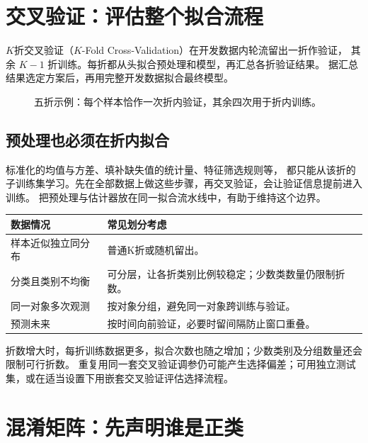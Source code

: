 \section{交叉验证：评估整个拟合流程}
\label{sec:eval-cv}

$K$折交叉验证（$K$-Fold Cross-Validation）在开发数据内轮流留出一折作验证，
其余 $K-1$ 折训练。每折都从头拟合预处理和模型，再汇总各折验证结果。
据汇总结果选定方案后，再用完整开发数据拟合最终模型。

\begin{figure}[htbp]
\centering
\caption{五折示例：每个样本恰作一次折内验证，其余四次用于折内训练。}
\label{fig:eval-cv}
\par\smallskip
{}
\end{figure}

\subsection{预处理也必须在折内拟合}
标准化的均值与方差、填补缺失值的统计量、特征筛选规则等，
都只能从该折的子训练集学习。先在全部数据上做这些步骤，再交叉验证，会让验证信息提前进入训练。
把预处理与估计器放在同一拟合流水线中，有助于维持这个边界。

\begin{center}
\small
\begin{tabularx}{\textwidth}{P{33mm}Y}
\toprule
数据情况 & 常见划分考虑\\
\midrule
样本近似独立同分布 & 普通K折或随机留出。\\
分类且类别不均衡 & 可分层，让各折类别比例较稳定；少数类数量仍限制折数。\\
同一对象多次观测 & 按对象分组，避免同一对象跨训练与验证。\\
预测未来 & 按时间向前验证，必要时留间隔防止窗口重叠。\\
\bottomrule
\end{tabularx}
\end{center}

折数增大时，每折训练数据更多，拟合次数也随之增加；少数类别及分组数量还会限制可行折数。
重复用同一套交叉验证调参仍可能产生选择偏差；可用独立测试集，或在适当设置下用嵌套交叉验证评估选择流程。

\section{混淆矩阵：先声明谁是正类}
\label{sec:eval-confusion}

